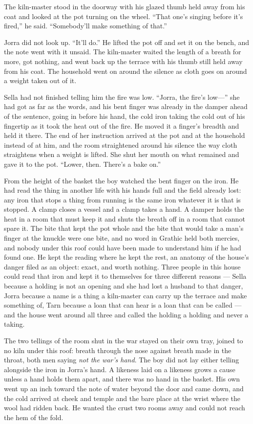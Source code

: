 The kiln-master stood in the doorway with his glazed thumb held away from his coat and looked at the pot turning on the wheel. “That one's singing before it's fired,” he said. “Somebody'll make something of that.”

Jorra did not look up. “It'll do.” He lifted the pot off and set it on the bench, and the note went with it unsaid. The kiln-master waited the length of a breath for more, got nothing, and went back up the terrace with his thumb still held away from his coat. The household went on around the silence as cloth goes on around a weight taken out of it.

Sella had not finished telling him the fire was low. “Jorra, the fire's low---” she had got as far as the words, and his bent finger was already in the damper ahead of the sentence, going in before his hand, the cold iron taking the cold out of his fingertip as it took the heat out of the fire. He moved it a finger's breadth and held it there. The end of her instruction arrived at the pot and at the household instead of at him, and the room straightened around his silence the way cloth straightens when a weight is lifted. She shut her mouth on what remained and gave it to the pot. “Lower, then. There's a bake on.”

From the height of the basket the boy watched the bent finger on the iron. He had read the thing in another life with his hands full and the field already lost: any iron that stops a thing from running is the same iron whatever it is that is stopped. A clamp closes a vessel and a clamp takes a hand. A damper holds the heat in a room that must keep it and shuts the breath off in a room that cannot spare it. The bite that kept the pot whole and the bite that would take a man's finger at the knuckle were one bite, and no word in Grathic held both mercies, and nobody under this roof could have been made to understand him if he had found one. He kept the reading where he kept the rest, an anatomy of the house's danger filed as an object: exact, and worth nothing. Three people in this house could read that iron and kept it to themselves for three different reasons --- Sella because a holding is not an opening and she had lost a husband to that danger, Jorra because a name is a thing a kiln-master can carry up the terrace and make something of, Tarn because a loan that can hear is a loan that can be called --- and the house went around all three and called the holding a holding and never a taking.

The two tellings of the room shut in the war stayed on their own tray, joined to no kiln under this roof: breath through the nose against breath made in the throat, both men saying \emph{not the war's hand}. The boy did not lay either telling alongside the iron in Jorra's hand. A likeness laid on a likeness grows a cause unless a hand holds them apart, and there was no hand in the basket. His own went up an inch toward the note of water beyond the door and came down, and the cold arrived at cheek and temple and the bare place at the wrist where the wool had ridden back. He wanted the crust two rooms away and could not reach the hem of the fold.

